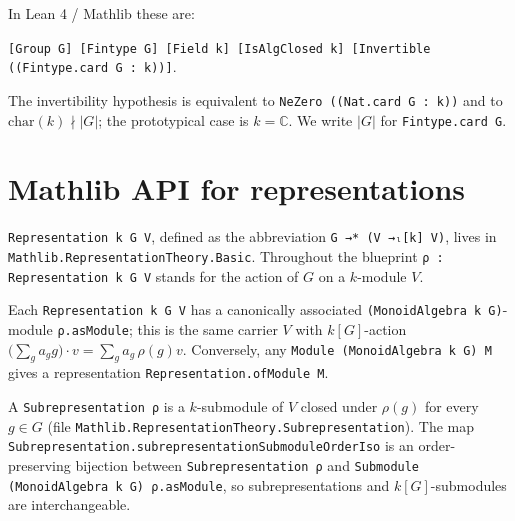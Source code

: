 \begin{definition}
  \label{def:standing-hypotheses}
  \mathlibok
  In Lean 4 / Mathlib these are:
  \begin{center}
    \texttt{[Group G] [Fintype G] [Field k] [IsAlgClosed k] [Invertible ((Fintype.card G : k))]}.
  \end{center}
  The invertibility hypothesis is equivalent to
  \texttt{NeZero ((Nat.card G : k))} and to $\mathrm{char}(k) \nmid |G|$;
  the prototypical case is $k = \mathbb C$. We write $|G|$ for
  \texttt{Fintype.card G}.
\end{definition}

\section{Mathlib API for representations}

\begin{definition}[Representation]
  \label{def:representation}
  \mathlibok
  \texttt{Representation k G V}, defined as the abbreviation
  \texttt{G →* (V →ₗ[k] V)}, lives in
  \texttt{Mathlib.RepresentationTheory.Basic}. Throughout the blueprint
  \texttt{ρ : Representation k G V} stands for the action of $G$ on a
  $k$-module $V$.
\end{definition}

\begin{definition}
  \label{def:as-module}
  \mathlibok
  Each \texttt{Representation k G V} has a canonically associated
  \texttt{(MonoidAlgebra k G)}-module \texttt{ρ.asModule}; this is the same
  carrier $V$ with $k[G]$-action $\big(\sum_g a_g g\big)\cdot v = \sum_g a_g\,\rho(g)v$.
  Conversely, any \texttt{Module (MonoidAlgebra k G) M} gives a representation
  \texttt{Representation.ofModule M}.
\end{definition}

\begin{definition}[Subrepresentation]
  \label{def:subrepresentation}
  \mathlibok
  A \texttt{Subrepresentation ρ} is a $k$-submodule of $V$ closed under
  $\rho(g)$ for every $g \in G$ (file
  \texttt{Mathlib.RepresentationTheory.Subrepresentation}). The map
  \texttt{Subrepresentation.subrepresentationSubmoduleOrderIso} is an
  order-preserving bijection between \texttt{Subrepresentation ρ} and
  \texttt{Submodule (MonoidAlgebra k G) ρ.asModule}, so subrepresentations and
  $k[G]$-submodules are interchangeable.
\end{definition}

